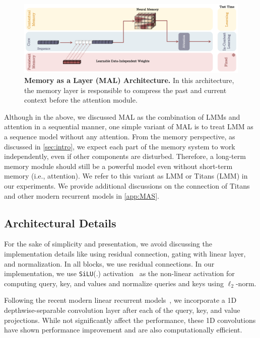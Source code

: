 \begin{figure}[t!]
    \centering
    \includegraphics[width=0.9\linewidth]{Figures/MAL.png}
    \caption{\textbf{Memory as a Layer (MAL) Architecture.} In this architecture, the memory layer is responsible to compress the past and current context before the attention module.}
    \label{fig:mal}
\end{figure}



Although in the above, we discussed MAL as the combination of LMMs and attention in a sequential manner, one simple variant of MAL is to treat LMM as a sequence model without any attention. From the memory perspective, as discussed in \autoref{sec:intro}, we expect each part of the memory system to work independently, even if other components are disturbed. Therefore, a long-term memory module should still be a powerful model even without short-term memory (i.e., attention). We refer to this variant as LMM or Titans (LMM) in our experiments. We provide additional discussions on the connection of Titans and other modern recurrent models in \autoref{app:MAS}. 



\subsection{Architectural Details}
For the sake of simplicity and presentation, we avoid discussing the implementation details like using residual connection, gating with linear layer, and normalization. In all blocks, we use residual connections. In our implementation, we use \texttt{SiLU}(.) activation~\citep{elfwing2018sigmoid} as the non-linear activation for computing query, key, and values and normalize queries and keys using $\ell_2$-norm. 

Following the recent modern linear recurrent models~\citep{yang2024gated, gu2024mamba}, we  incorporate a 1D depthwise-separable convolution layer after each of the query, key, and value projections. While not significantly affect the performance, these 1D convolutions have shown performance improvement and are also computationally efficient. 


